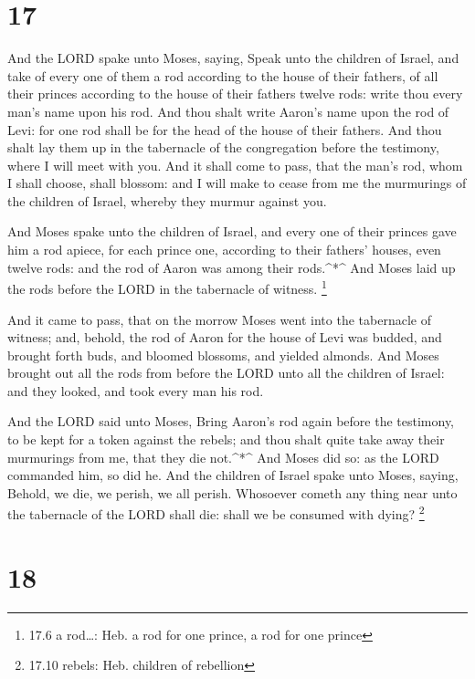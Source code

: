 \hypertarget{section-16}{%
\section{17}\label{section-16}}

 And the LORD spake unto Moses, saying,  Speak
unto the children of Israel, and take of every one of them a rod
according to the house of their fathers, of all their princes according
to the house of their fathers twelve rods: write thou every man's name
upon his rod.  And thou shalt write Aaron's name upon the
rod of Levi: for one rod shall be for the head of the house of their
fathers.  And thou shalt lay them up in the tabernacle of
the congregation before the testimony, where I will meet with you.
 And it shall come to pass, that the man's rod, whom I shall
choose, shall blossom: and I will make to cease from me the murmurings
of the children of Israel, whereby they murmur against you.

 And Moses spake unto the children of Israel, and every one
of their princes gave him a rod apiece, for each prince one, according
to their fathers' houses, even twelve rods: and the rod of Aaron was
among their rods.\^{}*\^{}  And Moses laid up the rods
before the LORD in the tabernacle of witness. \footnote{17.6 a
  rod\ldots: Heb. a rod for one prince, a rod for one prince}

 And it came to pass, that on the morrow Moses went into the
tabernacle of witness; and, behold, the rod of Aaron for the house of
Levi was budded, and brought forth buds, and bloomed blossoms, and
yielded almonds.  And Moses brought out all the rods from
before the LORD unto all the children of Israel: and they looked, and
took every man his rod.

 And the LORD said unto Moses, Bring Aaron's rod again
before the testimony, to be kept for a token against the rebels; and
thou shalt quite take away their murmurings from me, that they die
not.\^{}*\^{}  And Moses did so: as the LORD commanded him,
so did he.  And the children of Israel spake unto Moses,
saying, Behold, we die, we perish, we all perish. 
Whosoever cometh any thing near unto the tabernacle of the LORD shall
die: shall we be consumed with dying? \footnote{17.10 rebels: Heb.
  children of rebellion}

\hypertarget{section-17}{%
\section{18}\label{section-17}}

